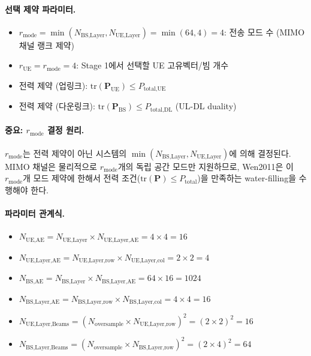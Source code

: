 \documentclass[10pt]{article}
\begin{document}
\paragraph{선택 제약 파라미터.}
\begin{itemize}
    \item $r_{\text{mode}} = \min(N_{\text{BS,Layer}}, N_{\text{UE,Layer}}) = \min(64, 4) = 4$: 전송 모드 수 (MIMO 채널 랭크 제약)
    \item $r_{\text{UE}} = r_{\text{mode}} = 4$: Stage 1에서 선택할 UE 고유벡터/빔 개수
    \item 전력 제약 (업링크): $\text{tr}(\mathbf{P}_{\text{UE}}) \leq P_{\text{total,UE}}$
    \item 전력 제약 (다운링크): $\text{tr}(\mathbf{P}_{\text{BS}}) \leq P_{\text{total,DL}}$ (UL-DL duality)
\end{itemize}

\paragraph{중요: $r_{\text{mode}}$ 결정 원리.}
$r_{\text{mode}}$는 전력 제약이 아닌 시스템의 $\min(N_{\text{BS,Layer}}, N_{\text{UE,Layer}})$에 의해 결정된다. MIMO 채널은 물리적으로 $r_{\text{mode}}$개의 독립 공간 모드만 지원하므로, Wen2011은 이 $r_{\text{mode}}$개 모드 제약에 한해서 전력 조건($\text{tr}(\mathbf{P}) \leq P_{\text{total}}$)을 만족하는 water-filling을 수행해야 한다.

\paragraph{파라미터 관계식.}
\begin{itemize}
    \item $N_{\text{UE,AE}} = N_{\text{UE,Layer}} \times N_{\text{UE,Layer,AE}} = 4 \times 4 = 16$
    \item $N_{\text{UE,Layer,AE}} = N_{\text{UE,Layer,row}} \times N_{\text{UE,Layer,col}} = 2 \times 2 = 4$
    \item $N_{\text{BS,AE}} = N_{\text{BS,Layer}} \times N_{\text{BS,Layer,AE}} = 64 \times 16 = 1024$
    \item $N_{\text{BS,Layer,AE}} = N_{\text{BS,Layer,row}} \times N_{\text{BS,Layer,col}} = 4 \times 4 = 16$
    \item $N_{\text{UE,Layer,Beams}} = (N_{\text{oversample}} \times N_{\text{UE,Layer,row}})^2 = (2 \times 2)^2 = 16$
    \item $N_{\text{BS,Layer,Beams}} = (N_{\text{oversample}} \times N_{\text{BS,Layer,row}})^2 = (2 \times 4)^2 = 64$
\end{itemize}
\end{document}
